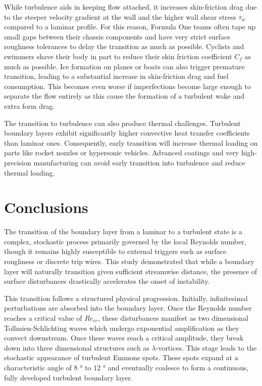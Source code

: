 \documentclass{article}
\begin{document}
While turbulence aids in keeping flow attached, it increases skin-friction drag due to the steeper velocity gradient at the wall and the higher wall shear stress $\tau_w$ compared to a laminar profile. For this reason, Formula One teams often tape up small gaps between their chassis components and have very strict surface roughness tolerances to delay the transition as much as possible. Cyclists and swimmers shave their body in part to reduce their skin friction coefficient $C_f$ as much as possible. Ice formation on planes or boats can also trigger premature transition, leading to a substantial increase in skin-friction drag and fuel consumption. This becomes even worse if imperfections become large enough to separate the flow entirely as this cause the formation of a turbulent wake and extra form drag.

The transition to turbulence can also produce thermal challenges. Turbulent boundary layers exhibit significantly higher convective heat transfer coefficients than laminar ones. Consequently, early transition will increase thermal loading on parts like rocket nozzles or hypersonic vehicles. Advanced coatings and very high-precision manufacturing can avoid early transition into turbulence and reduce thermal loading.


\section{Conclusions}

The transition of the boundary layer from a laminar to a turbulent state is a complex, stochastic process primarily governed by the local Reynolds number, though it remains highly susceptible to external triggers such as surface roughness or discrete trip wires. This study demonstrated that while a boundary layer will naturally transition given sufficient streamwise distance, the presence of surface disturbances drastically accelerates the onset of instability.

This transition follows a structured physical progression. Initially, infinitesimal perturbations are absorbed into the boundary layer. Once the Reynolds number reaches a critical value of $Re_{cr}$, these disturbances manifest as two dimensional Tollmien-Schlichting waves which undergo exponential amplification as they convect downstream. Once these waves reach a critical amplitude, they break down into three dimensional structures such as $\lambda$-vortices. This stage leads to the stochastic appearance of turbulent Emmons spots. These spots expand at a characteristic angle of 8 \si{\degree} to 12 \si{\degree} and eventually coalesce to form a continuous, fully developed turbulent boundary layer.
\end{document}
